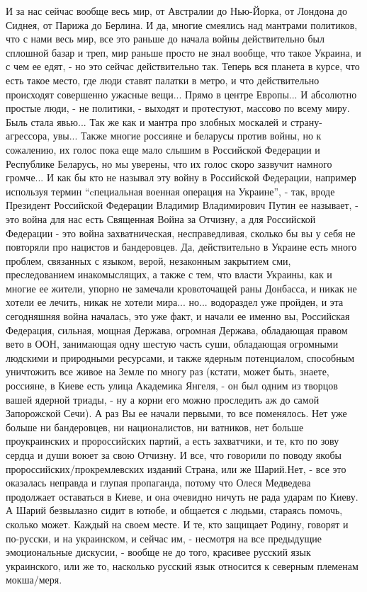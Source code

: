 И за нас сейчас вообще весь мир, от Австралии до Нью-Йорка, от Лондона до
Сиднея, от Парижа до Берлина. И да, многие смеялись над мантрами политиков, что
с нами весь мир, все это раньше до начала войны действительно был сплошной
базар и треп, мир раньше просто не знал вообще, что такое Украина, и с чем ее
едят, - но это сейчас действительно так. Теперь вся планета в курсе, что есть
такое место, где люди ставят палатки в метро, и что действительно происходят
совершенно ужасные вещи... Прямо в центре Европы...  И абсолютно простые люди,
- не политики, - выходят и протестуют, массово по всему миру. Быль стала
явью... Так же как и мантра про злобных москалей и страну-агрессора, увы...
Также многие россияне и беларусы против войны, но к сожалению, их голос пока
еще мало слышим в Российской Федерации и Республике Беларусь, но мы уверены,
что их голос скоро зазвучит намного громче... И как бы кто не называл эту войну
в Российской Федерации, например используя термин \enquote{cпециальная военная
операция на Украине}, - так, вроде Президент Российской Федерации Владимир
Владимирович Путин ее называет, - это война для нас есть Священная Война за
Отчизну, а для Российской Федерации - это война захватническая, несправедливая,
сколько бы вы у себя не повторяли про нацистов и бандеровцев. Да, действительно
в Украине есть много проблем, связанных с языком, верой, незаконным закрытием
сми, преследованием инакомыслящих, а также с тем, что власти Украины, как и
многие ее жители, упорно не замечали кровоточащей раны Донбасса, и никак не
хотели ее лечить, никак не хотели мира... но... водораздел уже пройден, и эта
сегодняшняя война началась, это уже факт, и начали ее именно вы, Российская
Федерация, сильная, мощная Держава, огромная Держава, обладающая правом вето в
ООН, занимающая одну шестую часть суши, обладающая огромными людскими и
природными ресурсами, и также ядерным потенциалом, способным уничтожить все
живое на Земле по многу раз (кстати, может быть, знаете, россияне, в Киеве есть
улица Академика Янгеля, -  он был одним из творцов вашей ядерной триады, - ну а
корни его можно проследить аж до самой Запорожской Сечи). А раз Вы ее начали
первыми, то все поменялось.  Нет уже больше ни бандеровцев, ни националистов,
ни ватников, нет больше проукраинских и пророссийских партий, а есть
захватчики, и те, кто по зову сердца и души воюет за свою Отчизну. И все, что
говорили по поводу якобы пророссийских/прокремлевских изданий Страна, или же
Шарий.Нет, - все это оказалась неправда и глупая пропаганда, потому что Олеся
Медведева продолжает оставаться в Киеве, и она очевидно ничуть не рада ударам
по Киеву. А Шарий безвылазно сидит в ютюбе, и общается с людьми, стараясь
помочь, сколько может. Каждый на своем месте. И те, кто защищает Родину,
говорят и по-русски, и на украинском, и сейчас им, - несмотря на все предыдущие
эмоциональные дискусии, - вообще не до того, красивее русский язык украинского,
или же то, насколько русский язык относится к северным племенам мокша/меря.

